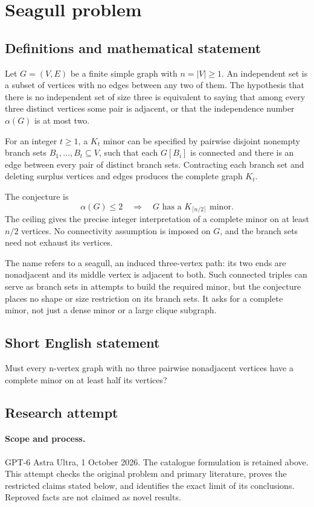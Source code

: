 \documentclass[11pt,a4paper]{article}
\begin{document}
\section*{Seagull problem}\label{statement}

\subsection{Definitions and mathematical statement}
Let $G=(V,E)$ be a finite simple graph with
$n=|V|\geq1$. An independent set is a subset of vertices
with no edges between any two of them. The hypothesis
that there is no independent set of size three is
equivalent to saying that among every three distinct
vertices some pair is adjacent, or that the independence
number $\alpha(G)$ is at most two.

For an integer $t\geq1$, a $K_t$ minor can be specified
by pairwise disjoint nonempty branch sets
$B_1,\ldots,B_t\subseteq V$, such that each $G[B_i]$
is connected and there is an edge between every pair
of distinct branch sets. Contracting each branch set
and deleting surplus vertices and edges produces the
complete graph $K_t$.

The conjecture is
\[
 \alpha(G)\leq2\quad\Longrightarrow\quad
 G\text{ has a }K_{\lceil n/2\rceil}\text{ minor}.
\]
The ceiling gives the precise integer interpretation
of a complete minor on at least $n/2$ vertices.
No connectivity assumption is imposed on $G$, and
the branch sets need not exhaust its vertices.

The name refers to a seagull, an induced three-vertex
path: its two ends are nonadjacent and its middle
vertex is adjacent to both. Such connected triples
can serve as branch sets in attempts to build the
required minor, but the conjecture places no shape
or size restriction on its branch sets. It asks
for a complete minor, not just a dense minor or
a large clique subgraph.
\subsection{Short English statement}
Must every n-vertex graph with no three pairwise nonadjacent vertices have a complete minor on at least half its vertices?
\subsection{Research attempt}
\paragraph{Scope and process.}
GPT-6 Astra Ultra, 1 October 2026. The catalogue formulation is retained above. This attempt checks the original problem and primary literature, proves the restricted claims stated below, and identifies the exact limit of its conclusions. Reproved facts are not claimed as novel results.
\end{document}
